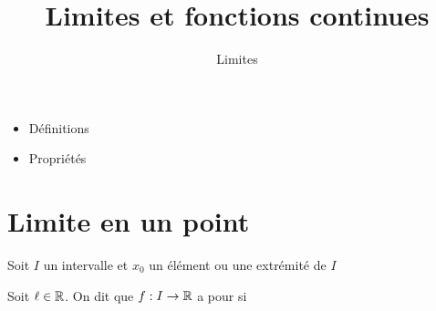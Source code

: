 







\title{{\bf Limites et fonctions continues}}
\subtitle{Limites}

\begin{frame}
  
  \debutmontitre

  \pause

{\footnotesize
\hfill
{}
\begin{minipage}{0.6\textwidth}
  \begin{itemize}
    \item<3-> Définitions
    \item<4-> Propriétés
   \end{itemize}
\end{minipage}
}

\end{frame}

\setcounter{framenumber}{0}



%
%
%
%


\section{Limite en un point} 

\begin{frame}

Soit $I$ un intervalle et $x_0$ un élément ou une extrémité de $I$

\pause

\begin{mydefinition}
Soit $\ell\in\mathbb{R}$. On dit que $f:I\to\mathbb{R}$ a pour  si 
\end{mydefinition}

\pause
{}

\end{frame}


